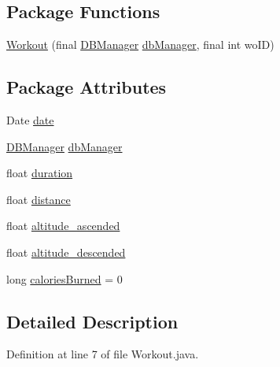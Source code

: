 \subsection*{Package Functions}
\begin{DoxyCompactItemize}
\item 
\mbox{\hyperlink{classcom_1_1activitytracker_1_1_workout_a2a991c1f2bcd46bc71e81b2c9bc3982a}{Workout}} (final \mbox{\hyperlink{classcom_1_1activitytracker_1_1_d_b_manager}{D\+B\+Manager}} \mbox{\hyperlink{classcom_1_1activitytracker_1_1_workout_a992aa5129fbae42bc1e18273826631e2}{db\+Manager}}, final int wo\+ID)
\end{DoxyCompactItemize}
\subsection*{Package Attributes}
\begin{DoxyCompactItemize}
\item 
Date \mbox{\hyperlink{classcom_1_1activitytracker_1_1_workout_a6b9fd61b438393f81296d43cd2c7820a}{date}}
\item 
\mbox{\hyperlink{classcom_1_1activitytracker_1_1_d_b_manager}{D\+B\+Manager}} \mbox{\hyperlink{classcom_1_1activitytracker_1_1_workout_a992aa5129fbae42bc1e18273826631e2}{db\+Manager}}
\item 
float \mbox{\hyperlink{classcom_1_1activitytracker_1_1_workout_ad21c7ace0611f0159d087d68ad950b8e}{duration}}
\item 
float \mbox{\hyperlink{classcom_1_1activitytracker_1_1_workout_a3c90aaba800c15e1a487af2ff5623c63}{distance}}
\item 
float \mbox{\hyperlink{classcom_1_1activitytracker_1_1_workout_a7ab77a8e27a53469c6bbd1e1497e0dcd}{altitude\+\_\+ascended}}
\item 
float \mbox{\hyperlink{classcom_1_1activitytracker_1_1_workout_a37158d4e44440e9f3e3d8106d92cf36c}{altitude\+\_\+descended}}
\item 
long \mbox{\hyperlink{classcom_1_1activitytracker_1_1_workout_a4eaade58e60df874ea7b8d0bc818bea7}{calories\+Burned}} = 0
\end{DoxyCompactItemize}


\subsection{Detailed Description}


Definition at line 7 of file Workout.\+java.



